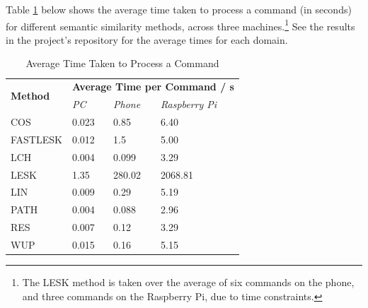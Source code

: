 \documentclass[11pt]{article}
\begin{document}
Table \ref{table:perf} below shows the average time taken to process a command (in seconds) for different semantic similarity methods, across three machines.\footnote{The LESK method is taken over the average of six commands on the phone, and three commands on the Raspberry Pi, due to time constraints.} See the results in the project's repository for the average times for each domain.

\begin{table}[H]
\centering
\caption{Average Time Taken to Process a Command}
\label{table:perf}
\begin{tabular}{l|l|l|l}
\multirow{2}{*}{\textbf{Method}} & \multicolumn{3}{l}{\textbf{Average Time per Command / s}} \\ \cline{2-4} 
                                 & \textit{PC}   & \textit{Phone}   & \textit{Raspberry Pi}   \\ \hline
COS                              & 0.023         & 0.85             & 6.40                    \\ \hline
FASTLESK                         & 0.012         & 1.5              & 5.00                    \\ \hline
LCH                              & 0.004         & 0.099            & 3.29                    \\ \hline
LESK                             & 1.35          & 280.02           & 2068.81 \\ \hline
LIN                              & 0.009         & 0.29             & 5.19                    \\ \hline
PATH                             & 0.004         & 0.088            & 2.96                    \\ \hline
RES                              & 0.007         & 0.12             & 3.29                    \\ \hline
WUP                              & 0.015         & 0.16             & 5.15                   
\end{tabular}
\end{table}
\end{document}
